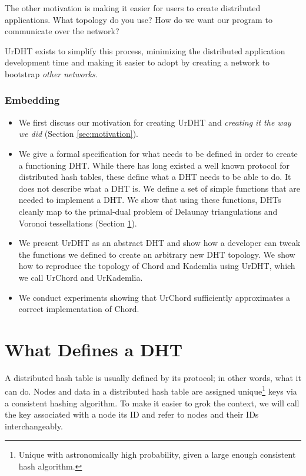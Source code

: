 \documentclass[11pt,conference]{IEEEtran}
\begin{document}
The other motivation is making it easier for users to create distributed applications.
What topology do you use?
How do we want our program to communicate over the network?


UrDHT exists to simplify this process, minimizing the distributed application development time and making it easier to adopt by creating a network to bootstrap \textit{other networks}.


\subsubsection{Embedding}






\begin{itemize}
	\item We first discuss our motivation for creating UrDHT and \textit{creating it the way we did}  (Section \ref{sec:motivation}).
	\item We give a formal specification for what needs to be defined in order to create a functioning DHT.
	While there has long existed a well known protocol for distributed hash tables, these define what a DHT needs to be able to do.
	It does not describe what a DHT is.
	We define a set of simple functions that are needed to implement a DHT.
	We show that using these functions, DHTs cleanly map to the primal-dual problem of Delaunay triangulations and Voronoi tessellations (Section \ref{sec:define}).
	\item We present UrDHT as an abstract DHT and show how a developer can tweak the functions we defined to create an arbitrary new DHT topology.
	We show how to reproduce the topology of Chord and Kademlia using UrDHT, which we call UrChord and UrKademlia.
	\item We conduct experiments showing that UrChord sufficiently approximates a correct implementation of Chord.
\end{itemize}


\section{What Defines a DHT}
\label{sec:define}

A distributed hash table is usually defined by its protocol; in other words, what it can do.
Nodes and data in a distributed hash table are assigned unique\footnote{Unique with astronomically high probability, given a large enough consistent hash algorithm.} keys via a consistent hashing algorithm.
To make it easier to grok the context, we will call the key associated with a node its ID and refer to  nodes and their IDs interchangeably.
\end{document}
